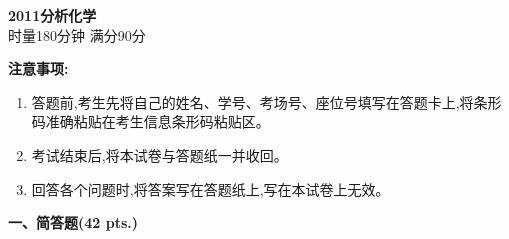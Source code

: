 \begin{center}
    {\LARGE \textbf{2011分析化学}} \\[2ex]
    {\large 时量180分钟 \quad 满分90分}
\end{center}

\vspace{0.5cm}
\noindent\textbf{注意事项:}
\begin{enumerate}[label=\arabic*., parsep=0pt, itemsep=0pt]
    \item 答题前,考生先将自己的姓名、学号、考场号、座位号填写在答题卡上,将条形码准确粘贴在考生信息条形码粘贴区。
    \item 考试结束后,将本试卷与答题纸一并收回。
    \item 回答各个问题时,将答案写在答题纸上,写在本试卷上无效。
\end{enumerate}

\vspace{0.5cm}
\noindent\textbf{一、简答题(42 pts.)}

